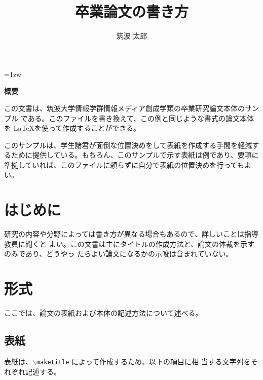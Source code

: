 \documentclass[a4paper,11pt]{jreport}
\title{卒業論文の書き方}
\author{筑波 太郎}
\begin{document}
\maketitle
\thispagestyle{empty}
\newpage

\thispagestyle{empty}
\vspace*{20pt plus 1fil}
\parindent=1zw
\noindent
\begin{center}
{\bf 概要}
\vspace{5mm}
\end{center}
この文書は、筑波大学情報学群情報メディア創成学類の卒業研究論文本体のサンプル
である。このファイルを書き換えて、この例と同じような書式の論文本体を
\LaTeX を使って作成することができる。

このサンプルは、学生諸君が面倒な位置決めをして表紙を作成する手間を軽減す
るために提供している。もちろん、このサンプルで示す表紙は例であり、要項に
準拠していれば、このファイルに頼らずに自分で表紙の位置決めを行ってもよい。

\par
\vspace{0pt plus 1fil}
\newpage

\tableofcontents
\listoffigures

\pagebreak \setcounter{page}{1}


\chapter{はじめに}

研究の内容や分野によっては書き方が異なる場合もあるので、詳しいことは指導教員に聞くと
よい。この文書は主にタイトルの作成方法と、論文の体裁を示すのみであり、どうやっ
たらよい論文になるかの示唆は含まれていない。

\chapter{形式}

ここでは、論文の表紙および本体の記述方法について述べる。

\section{表紙}

表紙は、{\tt $\backslash$maketitle} によって作成するため、以下の項目に相
当する文字列をそれぞれ記述する。
\end{document}
